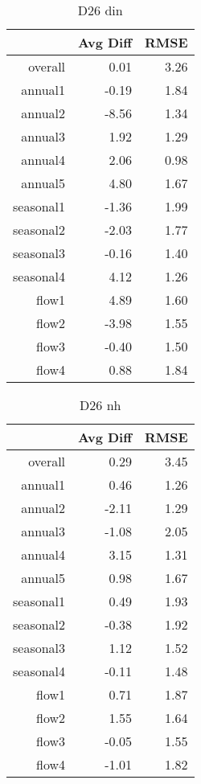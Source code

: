 \begin{table}[H]
\centering
\begin{tabular}{rrr}
  \hline
 & Avg Diff & RMSE \\ 
  \hline
overall & 0.01 & 3.26 \\ 
  annual1 & -0.19 & 1.84 \\ 
  annual2 & -8.56 & 1.34 \\ 
  annual3 & 1.92 & 1.29 \\ 
  annual4 & 2.06 & 0.98 \\ 
  annual5 & 4.80 & 1.67 \\ 
  seasonal1 & -1.36 & 1.99 \\ 
  seasonal2 & -2.03 & 1.77 \\ 
  seasonal3 & -0.16 & 1.40 \\ 
  seasonal4 & 4.12 & 1.26 \\ 
  flow1 & 4.89 & 1.60 \\ 
  flow2 & -3.98 & 1.55 \\ 
  flow3 & -0.40 & 1.50 \\ 
  flow4 & 0.88 & 1.84 \\ 
   \hline
\end{tabular}
\caption{D26 din} 
\end{table}
\begin{table}[H]
\centering
\begin{tabular}{rrr}
  \hline
 & Avg Diff & RMSE \\ 
  \hline
overall & 0.29 & 3.45 \\ 
  annual1 & 0.46 & 1.26 \\ 
  annual2 & -2.11 & 1.29 \\ 
  annual3 & -1.08 & 2.05 \\ 
  annual4 & 3.15 & 1.31 \\ 
  annual5 & 0.98 & 1.67 \\ 
  seasonal1 & 0.49 & 1.93 \\ 
  seasonal2 & -0.38 & 1.92 \\ 
  seasonal3 & 1.12 & 1.52 \\ 
  seasonal4 & -0.11 & 1.48 \\ 
  flow1 & 0.71 & 1.87 \\ 
  flow2 & 1.55 & 1.64 \\ 
  flow3 & -0.05 & 1.55 \\ 
  flow4 & -1.01 & 1.82 \\ 
   \hline
\end{tabular}
\caption{D26 nh} 
\end{table}
